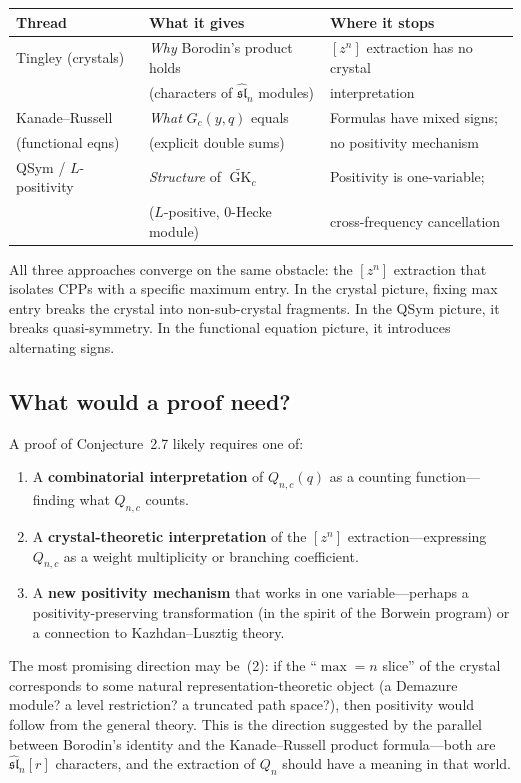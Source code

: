 \documentclass[11pt]{article}
\newcommand{\GK}{\operatorname{GK}}
\newcommand{\sln}{\widehat{\mathfrak{sl}}_n}
\begin{document}
\medskip
\begin{center}
\begin{tabular}{l|l|l}
  \textbf{Thread} & \textbf{What it gives} & \textbf{Where it stops} \\
  \hline
  Tingley (crystals) & \emph{Why} Borodin's product holds &
    $[z^n]$ extraction has no crystal \\
  & (characters of $\sln$ modules) & interpretation \\
  \hline
  Kanade--Russell & \emph{What} $G_c(y,q)$ equals &
    Formulas have mixed signs; \\
  (functional eqns) & (explicit double sums) & no positivity mechanism \\
  \hline
  QSym / $L$-positivity & \emph{Structure} of $\widetilde{\GK}_c$ &
    Positivity is one-variable; \\
  & ($L$-positive, $0$-Hecke module) & cross-frequency cancellation
\end{tabular}
\end{center}

\medskip

All three approaches converge on the same obstacle: the $[z^n]$
extraction that isolates CPPs with a specific maximum entry.
In the crystal picture, fixing max entry breaks the crystal into
non-sub-crystal fragments. In the QSym picture, it breaks
quasi-symmetry. In the functional equation picture, it
introduces alternating signs.

\subsection{What would a proof need?}

A proof of Conjecture~2.7 likely requires one of:
\begin{enumerate}
  \item A \textbf{combinatorial interpretation} of $Q_{n,c}(q)$
    as a counting function---finding what $Q_{n,c}$ counts.
  \item A \textbf{crystal-theoretic interpretation} of the
    $[z^n]$ extraction---expressing $Q_{n,c}$ as a weight
    multiplicity or branching coefficient.
  \item A \textbf{new positivity mechanism} that works in one
    variable---perhaps a positivity-preserving transformation
    (in the spirit of the Borwein program) or a connection to
    Kazhdan--Lusztig theory.
\end{enumerate}

The most promising direction may be~(2): if the
``$\max = n$ slice'' of the crystal corresponds to some natural
representation-theoretic object (a Demazure module? a level
restriction? a truncated path space?), then positivity would
follow from the general theory. This is the direction suggested
by the parallel between Borodin's identity and the
Kanade--Russell product formula---both are $\sln[r]$ characters,
and the extraction of $Q_n$ should have a meaning in that world.
\end{document}
